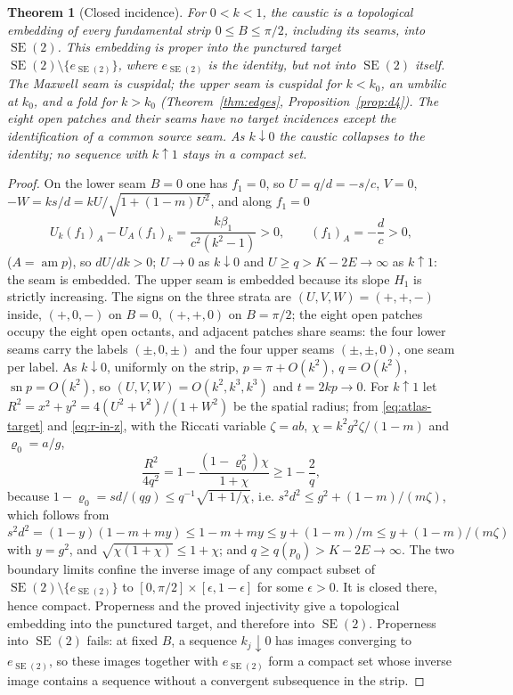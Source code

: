 \documentclass[11pt]{article}
\newtheorem{theorem}{Theorem}[section]
\theoremstyle{remark}
\newcommand{\SE}{\operatorname{SE}(2)}
\newcommand{\sn}{\operatorname{sn}}
\newcommand{\am}{\operatorname{am}}
\begin{document}
\begin{theorem}[Closed incidence]\label{thm:closed}
For $0<k<1$, the caustic is a topological embedding of every fundamental
strip $0\le B\le\pi/2$, including its seams, into $\SE$.  This embedding
is proper into the punctured target $\SE\setminus\{e_{\SE}\}$, where
$e_{\SE}$ is the identity, but not into $\SE$ itself.  The Maxwell seam
is cuspidal; the upper seam is cuspidal for $k<k_0$, an umbilic at $k_0$,
and a fold for $k>k_0$ (Theorem~\ref{thm:edges}, Proposition~\ref{prop:d4}).  The eight open patches and their seams have no target
incidences except the identification of a common source seam.  As
$k\downarrow0$ the caustic collapses to the identity; no sequence with
$k\uparrow1$ stays in a compact set.
\end{theorem}
\begin{proof}
On the lower seam $B=0$ one has $f_1=0$, so $U=q/d=-s/c$, $V=0$,
$-W=ks/d=kU/\sqrt{1+(1-m)U^2}$, and along $f_1=0$
\[
 U_k(f_1)_A-U_A(f_1)_k=\frac{k\beta_1}{c^2(k^2-1)}>0,\qquad (f_1)_A=-\frac dc>0,
\]
($A=\am p$), so $dU/dk>0$; $U\to0$ as $k\downarrow0$ and
$U\ge q>K-2E\to\infty$ as $k\uparrow1$: the seam is embedded.  The upper
seam is embedded because its slope $H_1$ is strictly increasing.  The signs
on the three strata are $(U,V,W)=(+,+,-)$ inside, $(+,0,-)$ on $B=0$,
$(+,+,0)$ on $B=\pi/2$; the eight open patches occupy the eight open
octants, and adjacent patches share seams: the four lower seams carry the
labels $(\pm,0,\pm)$ and the four upper seams $(\pm,\pm,0)$, one seam per
label.  As $k\downarrow0$,
uniformly on the strip, $p=\pi+O(k^2)$, $q=O(k^2)$, $\sn p=O(k^2)$, so
$(U,V,W)=O(k^2,k^3,k^3)$ and $t=2kp\to0$.  For $k\uparrow1$ let
$R^2=x^2+y^2=4(U^2+V^2)/(1+W^2)$ be the spatial radius; from
\eqref{eq:atlas-target} and \eqref{eq:r-in-z}, with the Riccati variable
$\zeta=ab$, $\chi=k^2g^2\zeta/(1-m)$ and $\varrho_0=a/g$,
\[
 \frac{R^2}{4q^2}=1-\frac{(1-\varrho_0^2)\chi}{1+\chi}\ge1-\frac2q,
\]
because $1-\varrho_0=sd/(qg)\le q^{-1}\sqrt{1+1/\chi}$, i.e.
$s^2d^2\le g^2+(1-m)/(m\zeta)$, which follows from
$s^2d^2=(1-y)(1-m+my)\le1-m+my\le y+(1-m)/m\le y+(1-m)/(m\zeta)$ with
$y=g^2$, and $\sqrt{\chi(1+\chi)}\le1+\chi$; and $q\ge q(p_0)>K-2E\to\infty$.
The two boundary limits confine the inverse image of any compact subset
of $\SE\setminus\{e_{\SE}\}$ to
$[0,\pi/2]\times[\epsilon,1-\epsilon]$ for some $\epsilon>0$.
It is closed there, hence compact.  Properness and the proved
injectivity give a topological embedding into the punctured target,
and therefore into $\SE$.  Properness into $\SE$ fails: at fixed $B$,
a sequence $k_j\downarrow0$ has images converging to $e_{\SE}$, so
these images together with $e_{\SE}$ form a compact set whose inverse
image contains a sequence without a convergent subsequence in the strip.
\end{proof}
\end{document}
